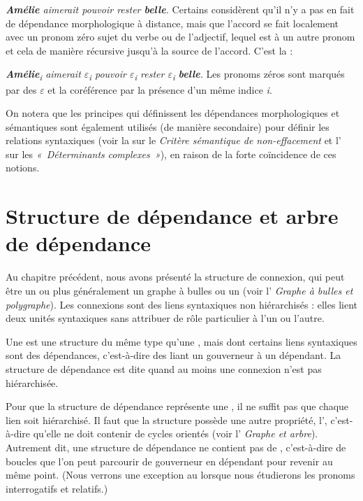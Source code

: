 {    \ea
        \textit{\textbf{{Amélie}}  {aimerait pouvoir rester} \textbf{{belle}}.}
    \z
    Certains considèrent qu’il n’y a pas en fait de dépendance morphologique à distance, mais que l’accord se fait localement avec un pronom zéro sujet du verbe ou de l’adjectif, lequel est  à un autre pronom et cela de manière récursive jusqu’à la source de l’accord. C’est la  :
    
    \ea
       \textit{ \textbf{{Amélie}}{\textsubscript{i}}  {aimerait} \textrm{${\varepsilon}$}{\textsubscript{i}}  {pouvoir} \textrm{${\varepsilon}$}{\textsubscript{i}}  {rester} \textrm{${\varepsilon}$}{\textsubscript{i}} \textbf{{belle}}.}
    \z
    Les pronoms zéros sont marqués par des \textrm{${\varepsilon}$} et la coréférence par la présence d’un même indice \textit{i}.

    On notera que les principes qui définissent les dépendances morphologiques et sémantiques sont également utilisés (de manière secondaire) pour définir les relations syntaxiques (voir la  sur le \textit{Critère sémantique de non-effacement} et l’ sur les \textit{«~Déterminants} \textit{complexes~»}), en raison de la forte coïncidence de ces notions.
}
\section{Structure de dépendance et arbre de dépendance}\label{sec:3.3.4}

Au chapitre précédent, nous avons présenté la structure de connexion, qui peut être un  ou plus généralement un graphe à bulles ou un  (voir l’ \textit{Graphe à bulles et polygraphe}). Les connexions sont des liens syntaxiques non hiérarchisés : elles lient deux unités syntaxiques sans attribuer de rôle particulier à l’un ou l’autre.

{Une  est une structure du même type qu’une , mais dont certains liens syntaxiques sont des dépendances, c’est-à-dire des  liant un gouverneur à un dépendant. La structure de dépendance est dite  quand au moins une connexion n’est pas hiérarchisée.}

Pour que la structure de dépendance représente une , il ne suffit pas que chaque lien soit hiérarchisé. Il faut que la structure possède une autre propriété, l’, c’est-à-dire qu’elle ne doit contenir de cycles orientés (voir l’ \textit{Graphe et arbre}). Autrement dit, une structure de dépendance ne contient pas de , c’est-à-dire de boucles que l’on peut parcourir de gouverneur en dépendant pour revenir au même point. (Nous verrons une exception au  lorsque nous étudierons les pronoms interrogatifs et relatifs.)

